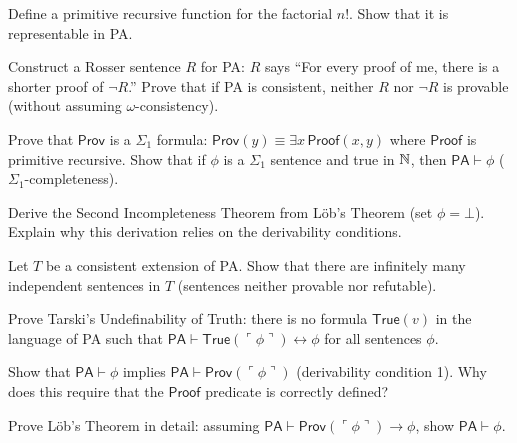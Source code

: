 \begin{exercise}[Basic]
Define a primitive recursive function for the factorial $n!$. Show that it is representable in PA.
\end{exercise}

\begin{exercise}[Intermediate]
Construct a Rosser sentence $R$ for PA: $R$ says ``For every proof of me, there is a shorter proof of $\neg R$.'' Prove that if PA is consistent, neither $R$ nor $\neg R$ is provable (without assuming $\omega$-consistency).
\end{exercise}

\begin{exercise}[Intermediate]
Prove that $\mathsf{Prov}$ is a $\Sigma_1$ formula: $\mathsf{Prov}(y) \equiv \exists x\, \mathsf{Proof}(x, y)$ where $\mathsf{Proof}$ is primitive recursive. Show that if $\phi$ is a $\Sigma_1$ sentence and true in $\mathbb{N}$, then $\mathsf{PA} \vdash \phi$ ($\Sigma_1$-completeness).
\end{exercise}

\begin{exercise}[Intermediate]
Derive the Second Incompleteness Theorem from Löb's Theorem (set $\phi = \bot$). Explain why this derivation relies on the derivability conditions.
\end{exercise}

\begin{exercise}[Intermediate]
Let $T$ be a consistent extension of PA. Show that there are infinitely many independent sentences in $T$ (sentences neither provable nor refutable).
\end{exercise}

\begin{exercise}[Intermediate]
Prove Tarski's Undefinability of Truth: there is no formula $\mathsf{True}(v)$ in the language of PA such that $\mathsf{PA} \vdash \mathsf{True}(\ulcorner \phi \urcorner) \leftrightarrow \phi$ for all sentences $\phi$.
\end{exercise}

\begin{exercise}[Intermediate]
Show that $\mathsf{PA} \vdash \phi$ implies $\mathsf{PA} \vdash \mathsf{Prov}(\ulcorner \phi \urcorner)$ (derivability condition 1). Why does this require that the $\mathsf{Proof}$ predicate is correctly defined?
\end{exercise}

\begin{exercise}[Advanced]
Prove Löb's Theorem in detail: assuming $\mathsf{PA} \vdash \mathsf{Prov}(\ulcorner \phi \urcorner) \to \phi$, show $\mathsf{PA} \vdash \phi$.
\end{exercise}

